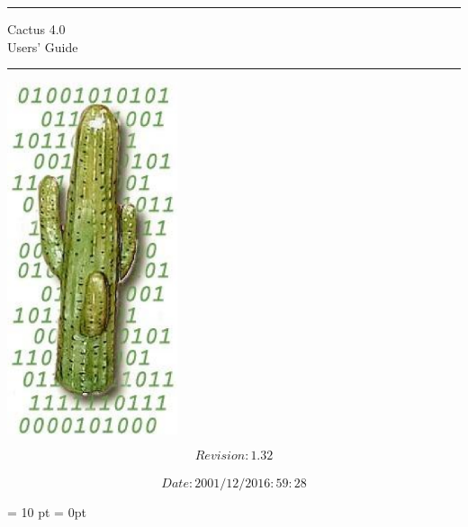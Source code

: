 \documentclass{report}
\newif\ifpdf
\newcommand{\cactustitlepage}[4][4.0]
{
\thispagestyle{empty}
\setlength{\parindent}{0mm}
\setlength{\parskip}{0mm}
\vspace*{\stretch{1}}
\rule{\linewidth}{1mm}
\begin{flushright}
  \Huge Cactus #1\\[5mm]
        #2
\end{flushright}
\rule{\linewidth}{1mm}
\vspace*{\stretch{2}}
\begin{center}
\ifpdf
\else
\includegraphics[angle=0,width=5cm]{bincactus2.eps}
\fi
\end{center}
\vspace*{\stretch{2}}
\begin{center}
   \Large #3 \\[3mm]
          #4
\end{center}
\newpage
\setlength{\parindent}{0mm}
\setlength{\parskip}{0mm}
}
\begin{document}
\ifpdf
\DeclareGraphicsExtensions{.pdf, .jpg}
\else
{}
\fi

\cactustitlepage{Users' Guide}{$$Revision: 1.32 $$}{$$Date: 2001/12/20 16:59:28 $$}

\setcounter{page}{1}


\tableofcontents


\renewcommand{\thepart}{\Alph{part}}
\renewcommand{\thechapter}{\Alph{part}\arabic{chapter}}
\renewcommand{\thepage}{\Alph{part}\arabic{page}}
\pagestyle{fancy}
\parskip = 10 pt
\parindent = 0pt

\newpage

















\end{document}
